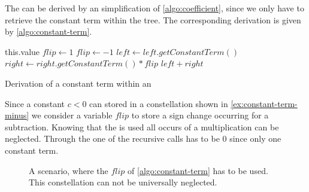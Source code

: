 The \updateconstants can be derived by an simplification of \autoref{algo:coefficient}, since we only have to retrieve the constant term within the tree. The corresponding derivation is given by \autoref{algo:constant-term}.

\begin{algorithm}[H]
	\begin{algorithmic}[1]
				\State \Return this.value
			\EndIf
			\State
			\State $flip \gets 1$
				\State $flip \gets -1$
			\EndIf
				\State $left \gets left.getConstantTerm()$ 
				\State $right \gets right.getConstantTerm()*flip$
				\State \Return $left+right$
			\EndIf
		\EndFunction
	\end{algorithmic}
	\caption{Derivation of a constant term within an \rpntree}
	\label{algo:constant-term}
\end{algorithm}
Since a constant $c < 0$ can stored in a constellation shown in \autoref{ex:constant-term-minus} we consider a variable $flip$ to store a sign change occurring for a subtraction. Knowing that the \stdLinInt is used all occurs of a multiplication can be neglected.\newline %
Through the \stdLinInt one of the recursive calls has to be $0$ since only one constant term.

\begin{figure}[H]
	\centering
	\caption{A scenario, where the $flip$ of \autoref{algo:constant-term} has to be used. This constellation can not be universally neglected.} %
	\label{ex:constant-term-minus}
\end{figure}

